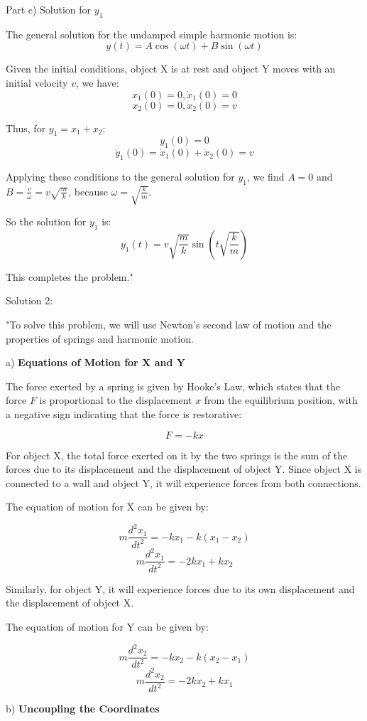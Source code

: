 Part c) Solution for \( y_{1} \)

The general solution for the undamped simple harmonic motion is:
\[ y(t) = A \cos(\omega t) + B \sin(\omega t) \]

Given the initial conditions, object X is at rest and object Y moves with an initial velocity \( v \), we have:
\[ x_{1}(0) = 0, \dot{x}_{1}(0) = 0 \]
\[ x_{2}(0) = 0, \dot{x}_{2}(0) = v \]

Thus, for \( y_{1} = x_{1} + x_{2} \):
\[ y_{1}(0) = 0 \]
\[ \dot{y}_{1}(0) = \dot{x}_{1}(0) + \dot{x}_{2}(0) = v \]

Applying these conditions to the general solution for \( y_{1} \), we find \( A = 0 \) and \( B = \frac{v}{\omega} = v \sqrt{\frac{m}{k}} \), because \( \omega = \sqrt{\frac{k}{m}} \).

So the solution for \( y_{1} \) is:
\[ y_{1}(t) = v \sqrt{\frac{m}{k}} \sin(t \sqrt{\frac{k}{m}}) \]

This completes the problem."

Solution 2: 

"To solve this problem, we will use Newton's second law of motion and the properties of springs and harmonic motion.

a) \textbf{Equations of Motion for X and Y}

The force exerted by a spring is given by Hooke's Law, which states that the force \( F \) is proportional to the displacement \( x \) from the equilibrium position, with a negative sign indicating that the force is restorative:

\[ F = -kx \]

For object X, the total force exerted on it by the two springs is the sum of the forces due to its displacement and the displacement of object Y. Since object X is connected to a wall and object Y, it will experience forces from both connections.

The equation of motion for X can be given by:

\[ m \frac{d^2 x_1}{dt^2} = -kx_1 - k(x_1 - x_2) \]
\[ m \frac{d^2 x_1}{dt^2} = -2kx_1 + kx_2 \]

Similarly, for object Y, it will experience forces due to its own displacement and the displacement of object X.

The equation of motion for Y can be given by:

\[ m \frac{d^2 x_2}{dt^2} = -kx_2 - k(x_2 - x_1) \]
\[ m \frac{d^2 x_2}{dt^2} = -2kx_2 + kx_1 \]

b) \textbf{Uncoupling the Coordinates}


